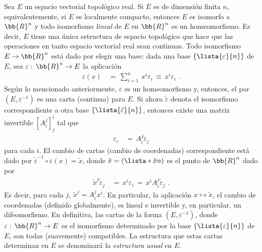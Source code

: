 



\begin{ejemplo}
	Sea $E$ un espacio vectorial topol\'{o}gico real. Si $E$ es de
	dimensi\'{o}n finita $n$, equivalentemente, si $E$ es
	localmente compacto, entonces $E$ es isomorfo a $\bb{R}^{n}$ y
	todo isomorfismo \emph{lineal} de $E$ en $\bb{R}^{n}$ es un
	homeomorfismo. Es decir, $E$ tiene una \'{u}nica estructura
	de espacio topol\'{o}gico que hace que las operaciones en tanto
	espacio vectorial real sean continuas. Todo isomorfismo
	$E\rightarrow\bb{R}^{n}$ est\'{a} dado por elegir una base: dada
	una base $\{\lista{\varepsilon}{n}\}$ de $E$, sea
	$\varepsilon:\,\bb{R}^{n}\rightarrow E$ la aplicaci\'{o}n
	\begin{align*}
		\varepsilon(x) & \,=\,\sum_{i=1}^{n}\,x^{i}\varepsilon_{i}
			\,\equiv\,x^{i}\varepsilon_{i}
		\text{ .}
	\end{align*}
	Seg\'{u}n lo mencionado anteriormente, $\varepsilon$ es un
	homeomorfismo y, entonces, el par $(E,\varepsilon^{-1})$ es una
	carta (continua) para $E$. Si ahora $\tilde{\varepsilon}$ denota
	el isomorfismo correspondiente a otra base
	$\{\lista{\tilde{\varepsilon}}{n}\}$, entonces existe una matriz
	invertible $\left[A_{i}^{j}\right]^{i}_{j}$ tal que
	\begin{align*}
		\varepsilon_{i} & \,=\,A_{i}^{j}\tilde{\varepsilon}_{j}
	\end{align*}
	para cada $i$. El cambio de cartas (cambio de coordenadas)
	correspondiente est\'{a} dado por
	$\tilde{\varepsilon}^{-1}\circ\varepsilon(x)=\tilde{x}$,
	donde $\tilde{x}=(\lista*{\tilde{x}}{n})$ es el punto de
	$\bb{R}^{n}$ dado por
	\begin{align*}
		\tilde{x}^{j}\tilde{\varepsilon}_{j} & \,=\,
			x^{i}\varepsilon_{i}
			\,=\,x^{i}A_{i}^{j}\tilde{\varepsilon}_{j}
		\text{ .}
	\end{align*}
	Es decir, para cada $j$, $\tilde{x}^{j}=A_{i}^{j}x^{i}$. En
	particular, la aplicaci\'{o}n $x\mapsto\tilde{x}$, el cambio de
	coordenadas (definido globalmente), es lineal e invertible y,
	en particular, un difeomorfismo. En definitiva, las cartas de la
	forma $(E,\varepsilon^{-1})$, donde
	$\varepsilon:\,\bb{R}^{n}\rightarrow E$ es el isomorfismo
	determinado por la base $\{\lista{\varepsilon}{n}\}$ de $E$,
	son todas (suavemente) compatibles. La estructura que estas cartas
	determinan en $E$ se denominar\'{a} la \emph{estructura usual} en $E$.
\end{ejemplo}

